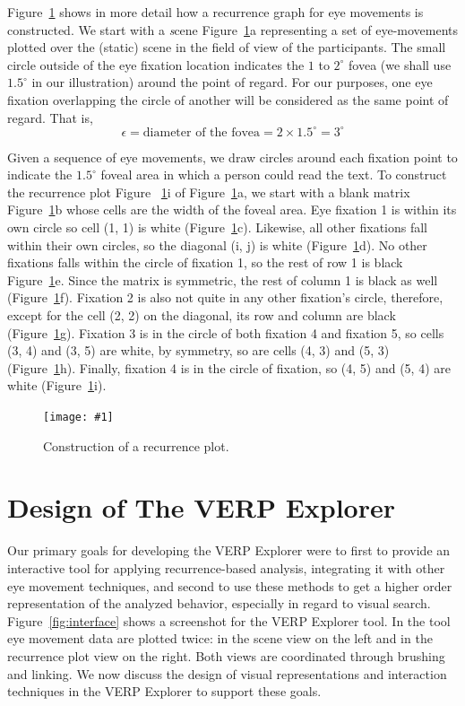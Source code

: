 \documentclass[journal]{vgtc}                %
\newcommand{\insertpicture}[2]{\begin{center}\texttt{[image: \#1]}\end{center}}
\DeclareRobustCommand{\deg}{^{\circ}\xspace}
\begin{document}
Figure~\ref{fig:construct} shows in more detail how a recurrence graph for eye
movements is constructed. We start with a {\emph scene} Figure~\ref{fig:construct}a
representing  a set of eye-movements plotted over the (static) scene in the
field of view of the participants. The small circle outside of the eye
fixation location indicates the $1$ to $2\deg$ fovea (we shall use $1.5\deg$  in our
illustration) around the point of regard. For our purposes, one eye
fixation overlapping the circle of another will be considered as the same
point of regard. That is, 
\[
\epsilon = \text{diameter of the fovea} = 2 \times 1.5\deg = 3\deg
\] 

Given a sequence of eye movements, we draw circles around each fixation
point to indicate the $1.5\deg$ foveal area in which a person could read the
text. To construct the recurrence plot Figure ~\ref{fig:construct}i of
Figure~\ref{fig:construct}a, we start with a blank matrix Figure~\ref{fig:construct}b 
whose cells are the width of the foveal area. Eye fixation 1  is within its own
circle so cell (1, 1) is white (Figure~\ref{fig:construct}c). Likewise, 
all other fixations fall within their own circles, so the diagonal (i, j) 
is white (Figure~\ref{fig:construct}d). No other fixations falls within 
the circle of fixation 1, so the rest of row 1 is black 
Figure~\ref{fig:construct}e. Since the matrix is symmetric, the rest of 
column 1 is black as well (Figure~\ref{fig:construct}f). 
Fixation 2  is also not quite in any other fixation’s circle, therefore,
except for the cell (2, 2) on the diagonal, its row and column are black 
(Figure~\ref{fig:construct}g). Fixation 3 is in the circle of both fixation 
4  and fixation 5, so cells (3, 4) and (3, 5) are white, by symmetry, so are 
cells (4, 3) and (5, 3) (Figure~\ref{fig:construct}h). Finally, fixation 4 
is in the circle of fixation, so (4, 5) and (5, 4) are white 
(Figure~\ref{fig:construct}i).


\begin{figure}
	\insertpicture{figures/rpconstruction.pdf}{0.5}
	\caption{ Construction of a recurrence plot.
    \label{fig:construct}}
\end{figure}



\section{Design of The VERP Explorer}

Our primary goals for developing the VERP Explorer were to first to provide
an interactive tool for applying recurrence-based analysis, integrating it
with other eye movement techniques, and second to use these methods to get
a higher order representation of the analyzed behavior, especially in
regard to visual search. Figure~\ref{fig:interface} shows a screenshot 
for the VERP Explorer tool.  In the tool eye movement data are plotted 
twice: in the scene view on the left and in the recurrence plot view on the 
right. Both views are coordinated through brushing and linking. 
We now discuss the design of visual representations and interaction techniques 
in the VERP Explorer to support these goals. 
\end{document}
